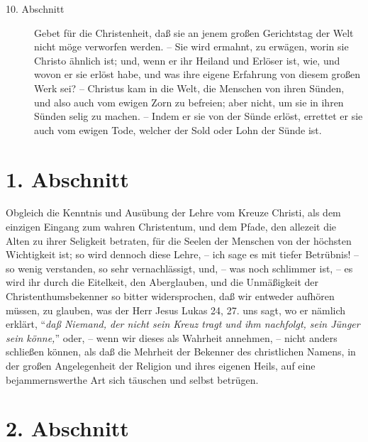\begin{description}
\item[10. Abschnitt] Gebet für die Christenheit, daß sie an jenem großen Gerichtstag der Welt nicht möge verworfen werden. -- Sie wird ermahnt, zu erwägen, worin sie Christo ähnlich ist; und, wenn er ihr Heiland und Erlöser ist, wie, und wovon er sie erlöst habe, und was ihre eigene Erfahrung von diesem großen Werk sei? -- Christus kam in die Welt, die Menschen von ihren Sünden, und also auch vom ewigen Zorn zu befreien; aber nicht, um sie in ihren Sünden selig zu machen. -- Indem er sie von der Sünde erlöst, errettet er sie auch vom ewigen Tode, welcher der Sold oder Lohn der Sünde ist.
\end{description}
\normalsize


\section{1. Abschnitt}

Obgleich die Kenntnis und Ausübung der Lehre vom Kreuze Christi, als dem einzigen Eingang zum wahren Christentum, und dem Pfade, den allezeit die Alten zu ihrer Seligkeit betraten, für die Seelen der Menschen von der höchsten Wichtigkeit ist; so wird dennoch diese Lehre, -- ich sage es mit tiefer Betrübnis! -- so wenig verstanden, so sehr vernachlässigt, und, -- was noch schlimmer ist, -- es wird ihr durch die Eitelkeit, den Aberglauben, und die Unmäßigkeit der Christenthumsbekenner so bitter widersprochen, daß wir entweder aufhören müssen, zu glauben, was der Herr Jesus Lukas 24, 27. uns sagt, wo er nämlich erklärt, "`\textit{daß Niemand, der nicht sein Kreuz tragt und ihm nachfolgt, sein Jünger sein könne,}"' oder, -- wenn wir dieses als Wahrheit annehmen, -- nicht anders schließen können, als daß die Mehrheit der Bekenner des christlichen Namens, in der großen Angelegenheit der Religion und ihres eigenen Heils, auf eine bejammernswerthe Art sich täuschen und selbst betrügen.

\section{2. Abschnitt}

